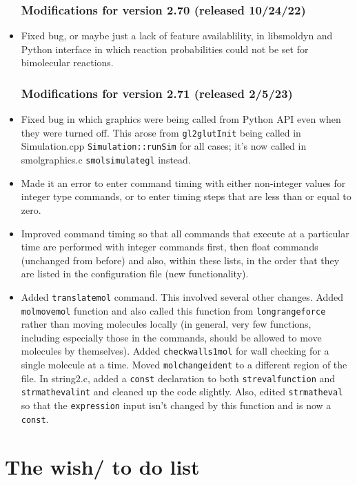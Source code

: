 \documentclass {scrbook}
\newcommand {\ttt} {\texttt}
\begin{document}
\begin{itemize}
\subsection*{Modifications for version 2.70 (released 10/24/22)}
\item Fixed bug, or maybe just a lack of feature availablility, in libsmoldyn and Python interface in which reaction probabilities could not be set for bimolecular reactions.

\subsection*{Modifications for version 2.71 (released 2/5/23)}
\item Fixed bug in which graphics were being called from Python API even when they were turned off. This arose from \ttt{gl2glutInit} being called in Simulation.cpp \ttt{Simulation::runSim} for all cases; it's now called in smolgraphics.c \ttt{smolsimulategl} instead.
\item Made it an error to enter command timing with either non-integer values for integer type commands, or to enter timing steps that are less than or equal to zero.
\item Improved command timing so that all commands that execute at a particular time are performed with integer commands first, then float commands (unchanged from before) and also, within these lists, in the order that they are listed in the configuration file (new functionality).
\item Added \ttt{translatemol} command. This involved several other changes. Added \ttt{molmovemol} function and also called this function from \ttt{longrangeforce} rather than moving molecules locally (in general, very few functions, including especially those in the commands, should be allowed to move molecules by themselves). Added \ttt{checkwalls1mol} for wall checking for a single molecule at a time. Moved \ttt{molchangeident} to a different region of the file. In string2.c, added a \ttt{const} declaration to both \ttt{strevalfunction} and \ttt{strmathevalint} and cleaned up the code slightly. Also, edited \ttt{strmatheval} so that the \ttt{expression} input isn't changed by this function and is now a \ttt{const}.

\end{itemize}


\chapter{The wish/ to do list}
\end{document}
